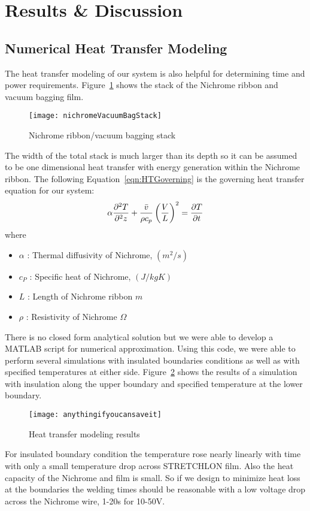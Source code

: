 \documentclass[12pt,letterpaper,notitlepage]{article}
\begin{document}
\section{Results \& Discussion}
\subsection{Numerical Heat Transfer Modeling}
The heat transfer modeling of our system is also helpful for determining time and power requirements. Figure~\ref{fig:nichromeVacuumBagStack} shows the stack of the Nichrome ribbon and vacuum bagging film.
\begin{figure}[H]
\centering
\texttt{[image: nichromeVacuumBagStack]}
\label{fig:nichromeVacuumBagStack}
\caption{Nichrome ribbon/vacuum bagging stack}
\end{figure}
The width of the total stack is much larger than its depth so it can be assumed to be one dimensional heat transfer with energy generation within the Nichrome ribbon. The following Equation~\ref{eqn:HTGoverning} is the governing heat transfer equation for our system:
\begin{equation}
\alpha  {\partial^2 T \over \partial^2 z} +{\bar{v} \over \rho     c_p } \left( {V \over L } \right)^2 = {\partial T \over \partial t}
\label{eqn:HTGoverning}
\end{equation}
where
\begin{center}
\begin{itemize}
        \item $\alpha$ : Thermal diffusivity of Nichrome, $(m^2/s)$
        \item $c_P$ : Specific heat of Nichrome, $(J/kgK)$
        \item $L$ : Length of Nichrome ribbon $m$
        \item $\rho$ : Resistivity of Nichrome $\Omega$\\
\end{itemize}
\end{center}
There is no closed form analytical solution but we were able to develop a MATLAB script for numerical approximation. Using this code, we were able to perform several simulations with insulated boundaries conditions as well as with specified temperatures at either side. Figure~\ref{fig:HTgraph} shows the results of a simulation with insulation along the upper boundary and specified temperature at the lower boundary.
\begin{figure}[H]
\centering
\texttt{[image: anythingifyoucansaveit]}
\label{fig:HTgraph}
\caption{Heat transfer modeling results}
\end{figure}
For insulated boundary condition the temperature rose nearly linearly with time with only a small temperature drop across STRETCHLON film. Also the heat capacity of the Nichrome and film is small. So if we design to minimize heat loss at the boundaries the welding times should be reasonable with a low voltage drop across the Nichrome wire, 1-20s for 10-50V.
\end{document}
